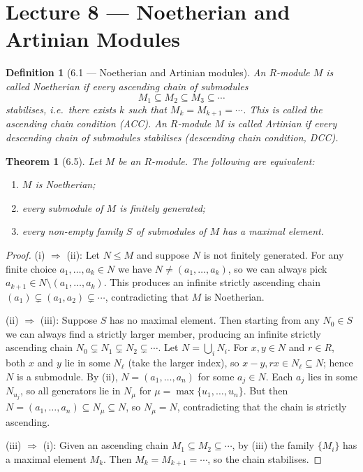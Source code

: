 \documentclass[12pt]{article}
\newtheorem{theorem}{Theorem}
\newtheorem{definition}{Definition}
\begin{document}
\section*{Lecture 8 — Noetherian and Artinian Modules}

\begin{definition}[6.1 — Noetherian and Artinian modules]
An $R$-module $M$ is called \emph{Noetherian} if every ascending chain of submodules
\[
  M_1 \subseteq M_2 \subseteq M_3 \subseteq \cdots
\]
stabilises, i.e.\ there exists $k$ such that $M_k = M_{k+1} = \cdots$. This is called the \emph{ascending chain condition} (ACC). An $R$-module $M$ is called \emph{Artinian} if every descending chain of submodules stabilises (\emph{descending chain condition}, DCC).
\end{definition}

\begin{theorem}[6.5]
Let $M$ be an $R$-module. The following are equivalent:
\begin{enumerate}[label=(\roman*)]
  \item $M$ is Noetherian;
  \item every submodule of $M$ is finitely generated;
  \item every non-empty family $S$ of submodules of $M$ has a maximal element.
\end{enumerate}
\end{theorem}

\begin{proof}
(i) $\Rightarrow$ (ii): Let $N \leq M$ and suppose $N$ is not finitely generated. For any finite choice $a_1,\ldots,a_k \in N$ we have $N \neq (a_1,\ldots,a_k)$, so we can always pick $a_{k+1} \in N \setminus (a_1,\ldots,a_k)$. This produces an infinite strictly ascending chain $(a_1) \subsetneq (a_1,a_2) \subsetneq \cdots$, contradicting that $M$ is Noetherian.

(ii) $\Rightarrow$ (iii): Suppose $S$ has no maximal element. Then starting from any $N_0 \in S$ we can always find a strictly larger member, producing an infinite strictly ascending chain $N_0 \subsetneq N_1 \subsetneq N_2 \subsetneq \cdots$. Let $N = \bigcup_i N_i$. For $x, y \in N$ and $r \in R$, both $x$ and $y$ lie in some $N_\ell$ (take the larger index), so $x - y, rx \in N_\ell \subseteq N$; hence $N$ is a submodule. By (ii), $N = (a_1,\ldots,a_n)$ for some $a_j \in N$. Each $a_j$ lies in some $N_{u_j}$, so all generators lie in $N_\mu$ for $\mu = \max\{u_1,\ldots,u_n\}$. But then $N = (a_1,\ldots,a_n) \subseteq N_\mu \subseteq N$, so $N_\mu = N$, contradicting that the chain is strictly ascending.

(iii) $\Rightarrow$ (i): Given an ascending chain $M_1 \subseteq M_2 \subseteq \cdots$, by (iii) the family $\{M_i\}$ has a maximal element $M_k$. Then $M_k = M_{k+1} = \cdots$, so the chain stabilises.
\end{proof}
\end{document}
